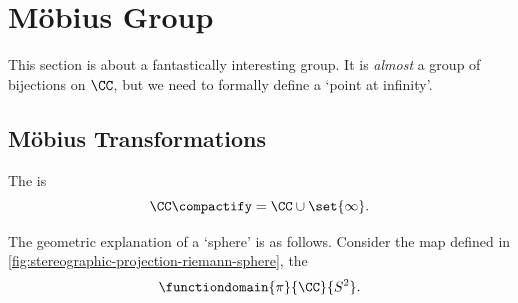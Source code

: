 \section{M\"{o}bius Group}
\label{sec:mobius-group}

This section is about a fantastically interesting group. It is \emph{almost} a group of bijections on \(\CC\), but we need to formally define a `point at infinity'.

\subsection{M\"{o}bius Transformations}

\begin{definition}
    \label{def:riemann-sphere}%
    The  is
    \[
        \CC\compactify = \CC \cup \set{\infty}.
    \]
\end{definition}

The geometric explanation of a `sphere' is as follows. Consider the map defined in \autoref{fig:stereographic-projection-riemann-sphere}, the 
\[
    \functiondomain{\pi}{\CC}{S^2}.
\]

